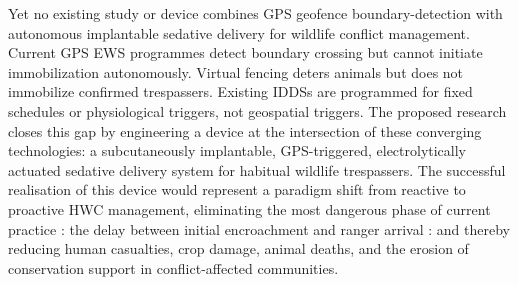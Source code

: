 \documentclass[12pt,a4paper]{article}
\begin{document}
    Yet no existing study or device combines GPS geofence boundary-detection with autonomous
    implantable sedative delivery for wildlife conflict management. Current GPS EWS programmes
    detect boundary crossing but cannot initiate immobilization autonomously. Virtual fencing
    deters animals but does not immobilize confirmed trespassers. Existing IDDSs are
    programmed for fixed schedules or physiological triggers, not geospatial triggers. The
    proposed research closes this gap by engineering a device at the intersection of these
    converging technologies: a subcutaneously implantable, GPS-triggered, electrolytically
    actuated sedative delivery system for habitual wildlife trespassers. The successful
    realisation of this device would represent a paradigm shift from reactive to proactive HWC
    management, eliminating the most dangerous phase of current practice : the delay between
    initial encroachment and ranger arrival : and thereby reducing human casualties, crop
    damage, animal deaths, and the erosion of conservation support in conflict-affected
    communities.



    
    
\end{document}
